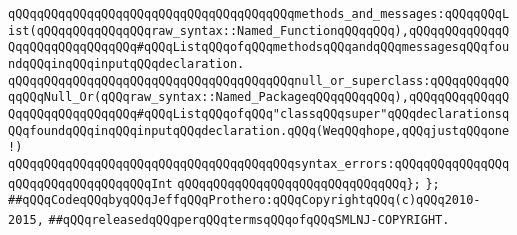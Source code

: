 \verb|qQQqqQQqqQQqqQQqqQQqqQQqqQQqqQQqqQQqqQQqmethods_and_messages:qQQqqQQqList(qQQqqQQqqQQqqQQqraw_syntax::Named_FunctionqQQqqQQq),qQQqqQQqqQQqqQQqqQQqqQQqqQQqqQQq#qQQqListqQQqofqQQqmethodsqQQqandqQQqmessagesqQQqfoundqQQqinqQQqinputqQQqdeclaration.|\newline
\verb|qQQqqQQqqQQqqQQqqQQqqQQqqQQqqQQqqQQqqQQqnull_or_superclass:qQQqqQQqqQQqqQQqNull_Or(qQQqraw_syntax::Named_PackageqQQqqQQqqQQq),qQQqqQQqqQQqqQQqqQQqqQQqqQQqqQQq#qQQqListqQQqofqQQq"classqQQqsuper"qQQqdeclarationsqQQqfoundqQQqinqQQqinputqQQqdeclaration.qQQq(WeqQQqhope,qQQqjustqQQqone!)|\newline
\verb|qQQqqQQqqQQqqQQqqQQqqQQqqQQqqQQqqQQqqQQqsyntax_errors:qQQqqQQqqQQqqQQqqQQqqQQqqQQqqQQqqQQqInt|\newline
\verb|qQQqqQQqqQQqqQQqqQQqqQQqqQQqqQQq};|\newline
\newline
\verb|};|\newline
\newline
\newline
\verb|##qQQqCodeqQQqbyqQQqJeffqQQqProthero:qQQqCopyrightqQQq(c)qQQq2010-2015,|\newline
\verb|##qQQqreleasedqQQqperqQQqtermsqQQqofqQQqSMLNJ-COPYRIGHT.|\newline

